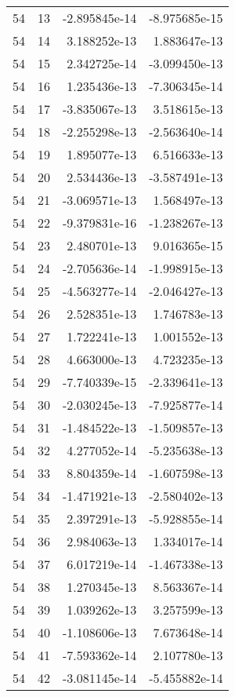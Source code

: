 \begin{tabular}{rrrr}
  54 &   13 & -2.895845e-14 & -8.975685e-15 \\
  54 &   14 &  3.188252e-13 &  1.883647e-13 \\
  54 &   15 &  2.342725e-14 & -3.099450e-13 \\
  54 &   16 &  1.235436e-13 & -7.306345e-14 \\
  54 &   17 & -3.835067e-13 &  3.518615e-13 \\
  54 &   18 & -2.255298e-13 & -2.563640e-14 \\
  54 &   19 &  1.895077e-13 &  6.516633e-13 \\
  54 &   20 &  2.534436e-13 & -3.587491e-13 \\
  54 &   21 & -3.069571e-13 &  1.568497e-13 \\
  54 &   22 & -9.379831e-16 & -1.238267e-13 \\
  54 &   23 &  2.480701e-13 &  9.016365e-15 \\
  54 &   24 & -2.705636e-14 & -1.998915e-13 \\
  54 &   25 & -4.563277e-14 & -2.046427e-13 \\
  54 &   26 &  2.528351e-13 &  1.746783e-13 \\
  54 &   27 &  1.722241e-13 &  1.001552e-13 \\
  54 &   28 &  4.663000e-13 &  4.723235e-13 \\
  54 &   29 & -7.740339e-15 & -2.339641e-13 \\
  54 &   30 & -2.030245e-13 & -7.925877e-14 \\
  54 &   31 & -1.484522e-13 & -1.509857e-13 \\
  54 &   32 &  4.277052e-14 & -5.235638e-13 \\
  54 &   33 &  8.804359e-14 & -1.607598e-13 \\
  54 &   34 & -1.471921e-13 & -2.580402e-13 \\
  54 &   35 &  2.397291e-13 & -5.928855e-14 \\
  54 &   36 &  2.984063e-13 &  1.334017e-14 \\
  54 &   37 &  6.017219e-14 & -1.467338e-13 \\
  54 &   38 &  1.270345e-13 &  8.563367e-14 \\
  54 &   39 &  1.039262e-13 &  3.257599e-13 \\
  54 &   40 & -1.108606e-13 &  7.673648e-14 \\
  54 &   41 & -7.593362e-14 &  2.107780e-13 \\
  54 &   42 & -3.081145e-14 & -5.455882e-14 \\

\end{tabular}

